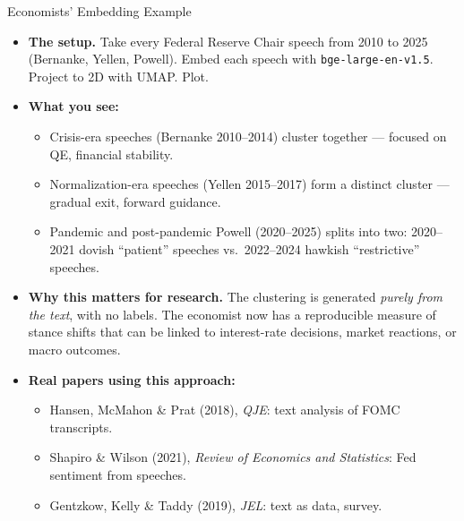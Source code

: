 \begin{frame}{Economists' Embedding Example}
\begin{itemize}
\item \textbf{The setup.} Take every Federal Reserve Chair speech from 2010 to 2025 (Bernanke, Yellen, Powell). Embed each speech with \texttt{bge-large-en-v1.5}. Project to 2D with UMAP. Plot.

\medskip
\item \textbf{What you see:}
\begin{itemize}
    \item Crisis-era speeches (Bernanke 2010--2014) cluster together --- focused on QE, financial stability.
    \item Normalization-era speeches (Yellen 2015--2017) form a distinct cluster --- gradual exit, forward guidance.
    \item Pandemic and post-pandemic Powell (2020--2025) splits into two: 2020--2021 dovish ``patient'' speeches vs.\ 2022--2024 hawkish ``restrictive'' speeches.
\end{itemize}

\medskip
\item \textbf{Why this matters for research.} The clustering is generated \emph{purely from the text}, with no labels. The economist now has a reproducible measure of stance shifts that can be linked to interest-rate decisions, market reactions, or macro outcomes.

\medskip
\item \textbf{Real papers using this approach:}
\begin{itemize}
    \item Hansen, McMahon \& Prat (2018), \emph{QJE}: text analysis of FOMC transcripts.
    \item Shapiro \& Wilson (2021), \emph{Review of Economics and Statistics}: Fed sentiment from speeches.
    \item Gentzkow, Kelly \& Taddy (2019), \emph{JEL}: text as data, survey.
\end{itemize}
\end{itemize}
\end{frame}

